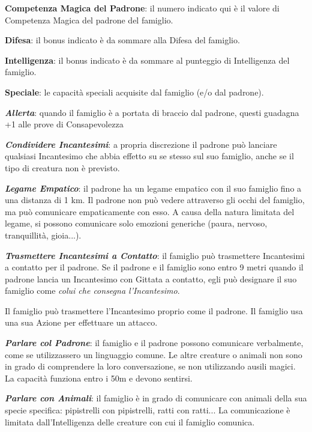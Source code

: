 \begin{multicols}{2}

\medskip

\textbf{Competenza Magica del Padrone}: il numero indicato qui è il valore di Competenza Magica del padrone del famiglio.

\textbf{Difesa}: il bonus indicato è da sommare alla Difesa del famiglio.

\textbf{Intelligenza}: il bonus indicato è da sommare al punteggio di Intelligenza del famiglio.

\textbf{Speciale}: le capacità speciali acquisite dal famiglio (e/o dal padrone).

\emph{\textbf{Allerta}}: quando il famiglio è a portata di braccio dal padrone, questi guadagna +1 alle prove di Consapevolezza

\emph{\textbf{Condividere Incantesimi}}\label{Condividere Incantesimi}\hypertarget{Condividere Incantesimi}{}: a propria discrezione il padrone può lanciare qualsiasi Incantesimo che abbia effetto su se stesso sul suo famiglio, anche se il tipo di creatura non è previsto.

\emph{\textbf{Legame Empatico}}: il padrone ha un legame empatico con il suo famiglio fino a una distanza di 1 km. Il padrone non può vedere attraverso gli occhi del famiglio, ma può comunicare empaticamente con esso. A causa della natura limitata del legame, si possono comunicare solo emozioni generiche (paura, nervoso, tranquillità, gioia...).

\emph{\textbf{Trasmettere Incantesimi a Contatto}}\label{Trasmettere Incantesimi a Contatto}\hypertarget{Trasmettere Incantesimi a Contatto}{}: il famiglio può trasmettere Incantesimi a contatto per il padrone. Se il padrone e il famiglio sono entro 9 metri quando il padrone lancia un Incantesimo con Gittata a contatto, egli può designare il suo famiglio come \emph{colui che consegna l'Incantesimo}.

Il famiglio può trasmettere l'Incantesimo proprio come il padrone. Il famiglio usa una sua Azione per effettuare un attacco.

\emph{\textbf{Parlare col Padrone}}: il famiglio e il padrone possono comunicare verbalmente, come se utilizzassero un linguaggio comune. Le altre creature o animali non sono in grado di comprendere la loro conversazione, se non utilizzando ausili magici. La capacità funziona entro i 50m e devono sentirsi.

\emph{\textbf{Parlare con Animali}}: il famiglio è in grado di comunicare con animali della sua specie specifica: pipistrelli con pipistrelli, ratti con ratti... La comunicazione è limitata dall'Intelligenza delle creature con cui il famiglio comunica.


\end{multicols}
